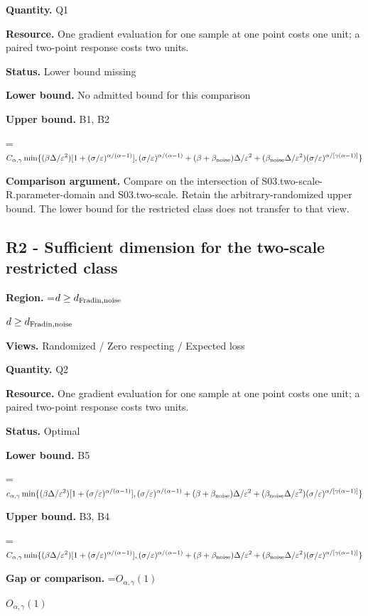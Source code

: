 \documentclass[10pt,a4paper]{article}
\newcommand{\AtlasMath}[1]{\par\begingroup\centering\setbox0=\hbox{$\displaystyle #1$}\ifdim\wd0>1.4\linewidth\typeout{ATLAS WIDE FORMULA: \the\wd0}\fi\ifdim\wd0>\linewidth\resizebox{\linewidth}{!}{\box0}\else\box0\fi\par\endgroup}
\newcommand{\AtlasInlineMath}[1]{\begingroup\setbox0=\hbox{$#1$}\ifdim\wd0>.4\linewidth\endgroup\AtlasMath{#1}\else\endgroup$#1$\fi}
\begin{document}
\textbf{Quantity.} Q1

\textbf{Resource.} One gradient evaluation for one sample at one point costs one unit; a paired two-point response costs two units.

\textbf{Status.} Lower bound missing

\textbf{Lower bound.} No admitted bound for this comparison

\textbf{Upper bound.} B1, B2

\AtlasMath{C_{\alpha,\gamma}\min\{(\beta\Delta/\varepsilon^2)[1+(\sigma/\varepsilon)^{\alpha/(\alpha-1)}],(\sigma/\varepsilon)^{\alpha/(\alpha-1)}+(\beta+\beta_{\rm noise})\Delta/\varepsilon^2+(\beta_{\rm noise}\Delta/\varepsilon^2)(\sigma/\varepsilon)^{\alpha/[\gamma(\alpha-1)]}\}}
\textbf{Comparison argument.} Compare on the intersection of S03.two-scale-R.parameter-domain and S03.two-scale. Retain the arbitrary-randomized upper bound. The lower bound for the restricted class does not transfer to that view.

\subsection{R2 - Sufficient dimension for the two-scale restricted class}
\textbf{Region.} \AtlasInlineMath{d\ge d_{\rm Fradin,noise}}

\textbf{Views.} Randomized / Zero respecting / Expected loss

\textbf{Quantity.} Q2

\textbf{Resource.} One gradient evaluation for one sample at one point costs one unit; a paired two-point response costs two units.

\textbf{Status.} Optimal

\textbf{Lower bound.} B5

\AtlasMath{c_{\alpha,\gamma}\min\{(\beta\Delta/\varepsilon^2)[1+(\sigma/\varepsilon)^{\alpha/(\alpha-1)}],(\sigma/\varepsilon)^{\alpha/(\alpha-1)}+(\beta+\beta_{\rm noise})\Delta/\varepsilon^2+(\beta_{\rm noise}\Delta/\varepsilon^2)(\sigma/\varepsilon)^{\alpha/[\gamma(\alpha-1)]}\}}
\textbf{Upper bound.} B3, B4

\AtlasMath{C_{\alpha,\gamma}\min\{(\beta\Delta/\varepsilon^2)[1+(\sigma/\varepsilon)^{\alpha/(\alpha-1)}],(\sigma/\varepsilon)^{\alpha/(\alpha-1)}+(\beta+\beta_{\rm noise})\Delta/\varepsilon^2+(\beta_{\rm noise}\Delta/\varepsilon^2)(\sigma/\varepsilon)^{\alpha/[\gamma(\alpha-1)]}\}}
\textbf{Gap or comparison.} \AtlasInlineMath{O_{\alpha,\gamma}(1)}
\end{document}
